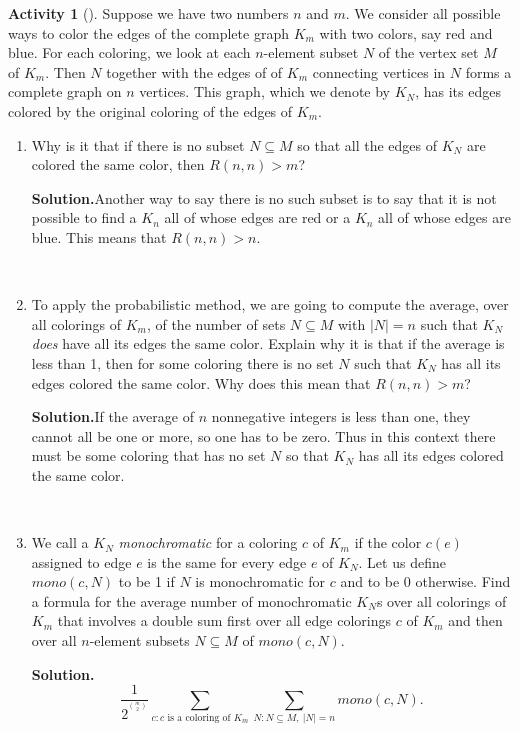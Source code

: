 \documentclass[10pt,]{book}
\theoremstyle{plain}
\theoremstyle{definition}
\newtheorem{activity}[project]{Activity}
\numberwithin{equation}{chapter}
\begin{document}
\begin{activity}[]\label{activity-82}
Suppose we have two numbers \(n\) and \(m\). We consider all possible ways to color the edges of the complete graph \(K_m\) with two colors, say red and blue. For each coloring, we look at each \(n\)-element subset \(N\) of the vertex set \(M\) of \(K_m\). Then \(N\) together with the edges of of \(K_m\) connecting vertices in \(N\) forms a complete graph on \(n\) vertices. This graph, which we denote by \(K_N\), has its edges colored by the original coloring of the edges of \(K_m\).%
~\par
\begin{enumerate}[label=(\alph*)]
 \item Why is it that if there is no subset \(N\subseteq M\) so that all the edges of \(K_N\) are colored the same color, then \(R(n,n)>m\)?%
\par\medskip\noindent%
\textbf{Solution.}\quad Another way to say there is no such subset is to say that it is not possible to find a \(K_n\) all of whose edges are red or a \(K_n\) all of whose edges are blue. This means that \(R(n,n)>n\).%

~\par
\item To apply the probabilistic method, we are going to compute the average, over all colorings of \(K_m\), of the number of sets \(N\subseteq M\) with \(|N|=n\) such that \(K_N\) \emph{does} have all its edges the same color. Explain why it is that if the average is less than 1, then for some coloring there is no set \(N\) such that \(K_N\) has all its edges colored the same color.  Why does this mean that \(R(n,n)>m\)?%
\par\medskip\noindent%
\textbf{Solution.}\quad If the average of \(n\) nonnegative integers is less than one, they cannot all be one or more, so one has to be zero. Thus in this context there must be some coloring that has no set \(N\) so that \(K_N\) has all its edges colored the same color.%

~\par
\item We call a \(K_N\) \emph{monochromatic} for a coloring \(c\) of \(K_m\) if the color \(c(e)\) assigned to edge \(e\) is the same for every edge \(e\) of \(K_N\).  Let us define \({ mono}(c,N)\) to be 1 if \(N\) is monochromatic for \(c\) and to be 0 otherwise.  Find a formula for the average number of monochromatic \(K_N\)s over all colorings of \(K_m\) that involves a double sum first over all edge colorings \(c\) of \(K_m\) and then over all \(n\)-element subsets \(N\subseteq M\) of \({
mono}(c,N)\).%
\par\medskip\noindent%
\textbf{Solution.}\quad %
\begin{equation*}
\frac{1}{2^{^\binom{m}{2}}}\sum_{c:c\mbox{~is a coloring
of~} K_m}\sum_{N:N\subseteq M,~|N|=n}{ mono}(c,N).
\end{equation*}


\end{enumerate}
\end{activity}
\end{document}
